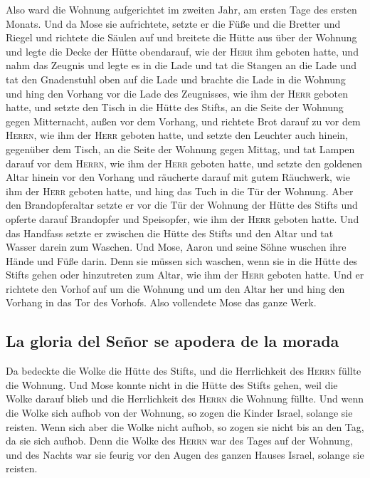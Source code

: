  Also ward die Wohnung aufgerichtet im zweiten Jahr, am
ersten Tage des ersten Monats.  Und da Mose sie
aufrichtete, setzte er die Füße und die Bretter und Riegel und richtete
die Säulen auf  und breitete die Hütte aus über der
Wohnung und legte die Decke der Hütte obendarauf, wie der \textsc{Herr}
ihm geboten hatte,  und nahm das Zeugnis und legte es in
die Lade und tat die Stangen an die Lade und tat den Gnadenstuhl oben
auf die Lade  und brachte die Lade in die Wohnung und
hing den Vorhang vor die Lade des Zeugnisses, wie ihm der \textsc{Herr}
geboten hatte,  und setzte den Tisch in die Hütte des
Stifts, an die Seite der Wohnung gegen Mitternacht, außen vor dem
Vorhang,  und richtete Brot darauf zu vor dem
\textsc{Herrn}, wie ihm der \textsc{Herr} geboten hatte, 
und setzte den Leuchter auch hinein, gegenüber dem Tisch, an die Seite
der Wohnung gegen Mittag,  und tat Lampen darauf vor dem
\textsc{Herrn}, wie ihm der \textsc{Herr} geboten hatte, 
und setzte den goldenen Altar hinein vor den Vorhang  und
räucherte darauf mit gutem Räuchwerk, wie ihm der \textsc{Herr} geboten
hatte,  und hing das Tuch in die Tür der Wohnung.
 Aber den Brandopferaltar setzte er vor die Tür der
Wohnung der Hütte des Stifts und opferte darauf Brandopfer und
Speisopfer, wie ihm der \textsc{Herr} geboten hatte.  Und
das Handfass setzte er zwischen die Hütte des Stifts und den Altar und
tat Wasser darein zum Waschen.  Und Mose, Aaron und seine
Söhne wuschen ihre Hände und Füße darin.  Denn sie müssen
sich waschen, wenn sie in die Hütte des Stifts gehen oder hinzutreten
zum Altar, wie ihm der \textsc{Herr} geboten hatte.  Und
er richtete den Vorhof auf um die Wohnung und um den Altar her und hing
den Vorhang in das Tor des Vorhofs. Also vollendete Mose das ganze Werk.

\hypertarget{la-gloria-del-seuxf1or-se-apodera-de-la-morada}{%
\subsection{La gloria del Señor se apodera de la
morada}\label{la-gloria-del-seuxf1or-se-apodera-de-la-morada}}

 Da bedeckte die Wolke die Hütte des Stifts, und die
Herrlichkeit des \textsc{Herrn} füllte die Wohnung.  Und
Mose konnte nicht in die Hütte des Stifts gehen, weil die Wolke darauf
blieb und die Herrlichkeit des \textsc{Herrn} die Wohnung füllte.
 Und wenn die Wolke sich aufhob von der Wohnung, so zogen
die Kinder Israel, solange sie reisten.  Wenn sich aber
die Wolke nicht aufhob, so zogen sie nicht bis an den Tag, da sie sich
aufhob.  Denn die Wolke des \textsc{Herrn} war des Tages
auf der Wohnung, und des Nachts war sie feurig vor den Augen des ganzen
Hauses Israel, solange sie reisten.
